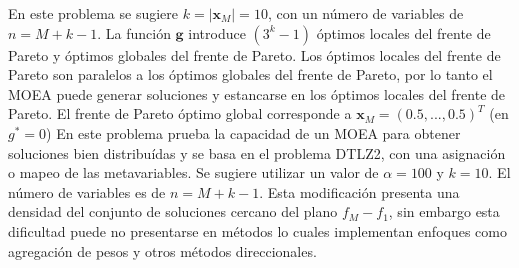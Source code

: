 En este problema se sugiere $k= | \mathbf{x}_M| =  10$, con un número de variables de $n = M + k -1$.
%
La función $\mathbf{g}$ introduce $( 3^k - 1)$ óptimos locales del frente de Pareto y óptimos globales del frente de Pareto.
%
Los óptimos locales del frente de Pareto son paralelos a los óptimos globales del frente de Pareto, por lo tanto el MOEA puede generar soluciones y estancarse en los óptimos locales del frente de Pareto.
%
El frente de Pareto óptimo global corresponde a $\mathbf{x}_M = (0.5, ..., 0.5)^T$ (en $g^* = 0$)
%
En este problema prueba la capacidad de un MOEA para obtener soluciones bien distribuídas y se basa en el problema DTLZ2, con una asignaci\'on o mapeo de las metavariables.
Se sugiere utilizar un valor de $\alpha = 100$ y $k=10$.
%
El n\'umero de variables es de $n=M+k-1$.
%
Esta modificación presenta una densidad del conjunto de soluciones cercano del plano $f_M - f_1$, sin embargo esta dificultad puede no presentarse en métodos lo cuales implementan enfoques como agregación de pesos y otros métodos direccionales.


